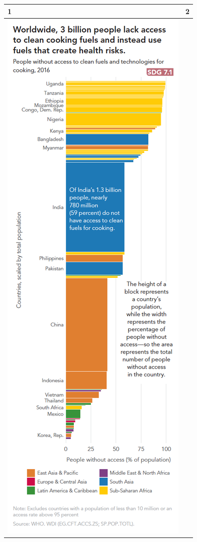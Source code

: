 \documentclass[]{book}
\begin{document}
\begin{longtable}[]{@{}ll@{}}
\toprule
1 & 2\tabularnewline
\midrule
\endhead
\includegraphics{images/case_study_4.png} &

\end{longtable}
\end{document}
